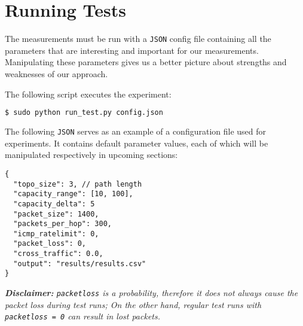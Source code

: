 \section{Running Tests}
The measurements must be run with a \texttt{JSON} config file containing all the parameters that are interesting and important for our measurements. Manipulating these parameters gives us a better picture about strengths and weaknesses of our approach.

The following script executes the experiment:
\begin{lstlisting}[language=bash]
  $ sudo python run_test.py config.json
\end{lstlisting}

The following \texttt{JSON} serves as an example of a configuration file used for experiments.
It contains default parameter values, each of which will be manipulated respectively in upcoming sections:
\begin{lstlisting}
{    
  "topo_size": 3, // path length
  "capacity_range": [10, 100],			
  "capacity_delta": 5
  "packet_size": 1400,
  "packets_per_hop": 300,
  "icmp_ratelimit": 0,
  "packet_loss": 0,
  "cross_traffic": 0.0,
  "output": "results/results.csv"
}
\end{lstlisting}

\textit{\textbf{Disclaimer:} \texttt{packet\textunderscore loss} is a probability, therefore it does not always cause the packet loss during test runs; On the other hand, regular test runs with \texttt{packet\textunderscore loss = 0} can result in lost packets.}
